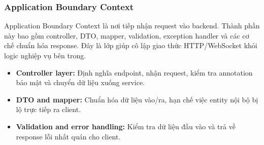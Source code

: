 \subsubsection{Application Boundary Context}
\label{subsubsec:application-boundary-context}

Application Boundary Context là nơi tiếp nhận request vào backend. Thành phần này bao gồm controller, DTO, mapper, validation, exception handler và các cơ chế chuẩn hóa response. Đây là lớp giúp cô lập giao thức HTTP/WebSocket khỏi logic nghiệp vụ bên trong.

\begin{itemize}
    \item \textbf{Controller layer:} Định nghĩa endpoint, nhận request, kiểm tra annotation bảo mật và chuyển dữ liệu xuống service.
    \item \textbf{DTO and mapper:} Chuẩn hóa dữ liệu vào/ra, hạn chế việc entity nội bộ bị lộ trực tiếp ra client.
    \item \textbf{Validation and error handling:} Kiểm tra dữ liệu đầu vào và trả về response lỗi nhất quán cho client.
\end{itemize}